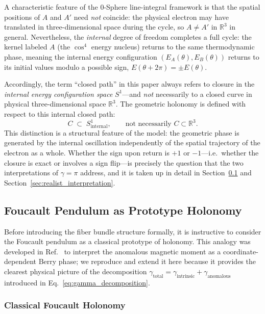\documentclass[%
 reprint,
 amsmath,amssymb,
 aps,
 prb,
]{revtex4-2}
\numberwithin{equation}{section}
\theoremstyle{definition}
\theoremstyle{remark}
\newcommand{\Sone}{S^1}
\begin{document}
A characteristic feature of the 0-Sphere line-integral framework is that the spatial positions of $A$ and $A'$ need \emph{not} coincide: the physical electron may have translated in three-dimensional space during the cycle, so $A \neq A'$ in $\mathbb{R}^3$ in general. Nevertheless, the \emph{internal} degree of freedom completes a full cycle: the kernel labeled $A$ (the $\cos^4$ energy nucleus) returns to the same thermodynamic phase, meaning the internal energy configuration $(E_A(\theta), E_B(\theta))$ returns to its initial values modulo a possible sign, $E(\theta + 2\pi) = \pm E(\theta)$.

Accordingly, the term ``closed path'' in this paper always refers to closure in the \emph{internal energy configuration space} $\Sone$---and \emph{not} necessarily to a closed curve in physical three-dimensional space $\mathbb{R}^3$. The geometric holonomy is defined with respect to this internal closed path:
\begin{equation}
C \;\subset\; \Sone_{\text{internal}},
\qquad
\text{not necessarily } C \subset \mathbb{R}^3.
\label{eq:closure_definition}
\end{equation}
This distinction is a structural feature of the model: the geometric phase is generated by the internal oscillation independently of the spatial trajectory of the electron as a whole. Whether the sign upon return is $+1$ or $-1$---i.e.\ whether the closure is exact or involves a sign flip---is precisely the question that the two interpretations of $\gamma = \pi$ address, and it is taken up in detail in Section~\ref{sec:foucault} and Section~\ref{sec:realist_interpretation}.

\subsection{Foucault Pendulum as Prototype Holonomy}
\label{sec:foucault}

Before introducing the fiber bundle structure formally, it is instructive to consider the Foucault pendulum as a classical prototype of holonomy. This analogy was developed in Ref.~\cite{Hanamura_2025_26} to interpret the anomalous magnetic moment as a coordinate-dependent Berry phase; we reproduce and extend it here because it provides the clearest physical picture of the decomposition $\gamma_{\text{total}} = \gamma_{\text{intrinsic}} + \gamma_{\text{anomalous}}$ introduced in Eq.~\eqref{eq:gamma_decomposition}.

\subsubsection{Classical Foucault Holonomy}
\end{document}
